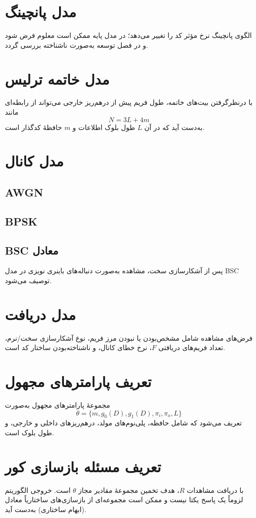 \section{مدل پانچینگ}
الگوی پانچینگ نرخ مؤثر کد را تغییر می‌دهد؛ در مدل پایه ممکن است معلوم فرض شود و در فصل توسعه به‌صورت ناشناخته بررسی گردد.

\section{مدل خاتمه ترلیس}
با درنظرگرفتن بیت‌های خاتمه، طول فریم پیش از درهم‌ریز خارجی می‌تواند از رابطه‌ای مانند
\begin{equation}
	N = 3L + 4m
	\label{eq:frame-length}
\end{equation}
به‌دست آید که در آن \(L\) طول بلوک اطلاعات و \(m\) حافظهٔ کدگذار است.

\section{مدل کانال}
\subsection{AWGN}
\subsection{BPSK}
\subsection{BSC معادل}
پس از آشکارسازی سخت، مشاهده به‌صورت دنباله‌های باینری نویزی در مدل BSC توصیف می‌شود.

\section{مدل دریافت}
فرض‌های مشاهده شامل مشخص‌بودن یا نبودن مرز فریم، نوع آشکارسازی سخت/نرم، تعداد فریم‌های دریافتی \(F\)، نرخ خطای کانال، و ناشناخته‌بودن ساختار کد است.

\section{تعریف پارامترهای مجهول}
مجموعهٔ پارامترهای مجهول به‌صورت
\begin{equation}
	\theta = \{m, g_0(D), g_1(D), \pi_i, \pi_o, L\}
	\label{eq:theta}
\end{equation}
تعریف می‌شود که شامل حافظه، پلی‌نوم‌های مولد، درهم‌ریزهای داخلی و خارجی، و طول بلوک است.

\section{تعریف مسئله بازسازی کور}
با دریافت مشاهدات \(R\)، هدف تخمین مجموعهٔ مقادیر مجاز \(\theta\) است. خروجی الگوریتم لزوماً یک پاسخ یکتا نیست و ممکن است مجموعه‌ای از بازسازی‌های ساختاریاً معادل (ابهام ساختاری) به‌دست آید.
